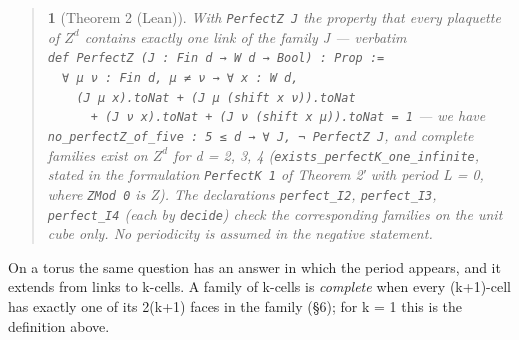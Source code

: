 \documentclass[11pt,a4paper]{article}
\theoremstyle{named}
\newtheorem*{namedthm}{}
\begin{document}
\begin{quote}
\begin{namedthm}[Theorem 2 (Lean)]
With \texttt{PerfectZ\ \allowbreak{}J} the property that every plaquette of $Z^d$ contains exactly one link of the family J — verbatim\\
\texttt{def\ \allowbreak{}PerfectZ\ \allowbreak{}(J\ \allowbreak{}:\ \allowbreak{}Fin\ \allowbreak{}d\ \allowbreak{}→\ \allowbreak{}W\ \allowbreak{}d\ \allowbreak{}→\ \allowbreak{}Bool)\ \allowbreak{}:\ \allowbreak{}Prop\ \allowbreak{}:=}\\
\texttt{\ \allowbreak{}\ \allowbreak{}∀\ \allowbreak{}μ\ \allowbreak{}ν\ \allowbreak{}:\ \allowbreak{}Fin\ \allowbreak{}d,\ \allowbreak{}μ\ \allowbreak{}≠\ \allowbreak{}ν\ \allowbreak{}→\ \allowbreak{}∀\ \allowbreak{}x\ \allowbreak{}:\ \allowbreak{}W\ \allowbreak{}d,}\\
\texttt{\ \allowbreak{}\ \allowbreak{}\ \allowbreak{}\ \allowbreak{}(J\ \allowbreak{}μ\ \allowbreak{}x).\allowbreak{}toNat\ \allowbreak{}+\ \allowbreak{}(J\ \allowbreak{}μ\ \allowbreak{}(shift\ \allowbreak{}x\ \allowbreak{}ν)).\allowbreak{}toNat}\\
\texttt{\ \allowbreak{}\ \allowbreak{}\ \allowbreak{}\ \allowbreak{}\ \allowbreak{}\ \allowbreak{}+\ \allowbreak{}(J\ \allowbreak{}ν\ \allowbreak{}x).\allowbreak{}toNat\ \allowbreak{}+\ \allowbreak{}(J\ \allowbreak{}ν\ \allowbreak{}(shift\ \allowbreak{}x\ \allowbreak{}μ)).\allowbreak{}toNat\ \allowbreak{}=\ \allowbreak{}1} — we have \texttt{no\_\allowbreak{}perfectZ\_\allowbreak{}of\_\allowbreak{}five\ \allowbreak{}:\ \allowbreak{}5\ \allowbreak{}≤\ \allowbreak{}d\ \allowbreak{}→\ \allowbreak{}∀\ \allowbreak{}J,\ \allowbreak{}¬\ \allowbreak{}PerfectZ\ \allowbreak{}J}, and complete families exist on $Z^d$ for d = 2, 3, 4 (\texttt{exists\_\allowbreak{}perfectK\_\allowbreak{}one\_\allowbreak{}infinite}, stated in the formulation \texttt{PerfectK\ \allowbreak{}1} of Theorem 2′ with period L = 0, where \texttt{ZMod\ \allowbreak{}0} is Z). The declarations \texttt{perfect\_\allowbreak{}I2}, \texttt{perfect\_\allowbreak{}I3}, \texttt{perfect\_\allowbreak{}I4} (each by \texttt{decide}) check the corresponding families on the unit cube only. No periodicity is assumed in the negative statement.
\end{namedthm}
\end{quote}
On a torus the same question has an answer in which the period appears, and it extends from links to k-cells. A family of k-cells is \textit{complete} when every (k+1)-cell has exactly one of its 2(k+1) faces in the family (§6); for k = 1 this is the definition above.
\end{document}
